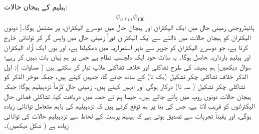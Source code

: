  ہیلیم کے ہیجان حالات: 
\begin{align}
 \psi_{n\ell m} \psi_{100}
 \end{align}
ہائیڈروجنی زمینی حال میں ایک الیکٹران اور ہیجان حال میں دوسرے الیکٹران، پر مشتمل ہوگا۔[ دونوں الیکٹران کو ہیجان حالات میں ڈالنے سے ایک الیکٹران فوراً زمینی حال میں واپس گر کر توانائی خارج کرتا ہے، جو دوسرے الیکٹران کو جوہر سے باہر استمراریہ  میں دھکیلتا ہے، اور یوں ایک آزاد الیکٹران اور ہیلیم بارداریہ  حاصل ہوگا۔ یہ بذات خود ایک دلچسپ نظام ہے جس پر ہم یہاں بات نہیں کر رہے؛ سوال  دیکھیں] ہم ہمیشہ کی طرح تشاکلی اور خلاف تشاکلی ملاپ تیار کر سکتے ہیں ( مساوات ); اول الذکر خلاف تشاکلی چکر تشکیل (یک تا) کے ساتھ جائے گا، جنہیں  کہتے ہیں، جبکہ موخر الذکر کو تشاکلی چکر تشکیل ( سہ تا) درکار ہوگی اور انہیں  کہتے ہیں۔ زمینی حال لازماً نزدہیلیم ہوگا؛ جبکہ ہیجان حالات دونوں روپ میں پائے جاتے ہیں۔ جیسا ہم نے حصہ  میں دریافت کیا، تشاکلی فضائی حال الیکٹرانوں کو قریب لاتا ہے، جس کی بنا پر ہم توقع کرتے ہیں کہ نزدہیلیم کی باہم متعامل توانائی زیادہ ہوگی، اور یقیناً تجربات سے تصدیق ہوتی ہے کہ ہیلیم پرست کے لحاظ سے نزدہیلیم حالات کی توانائی زیادہ ہے ( شکل  دیکھیں)۔

